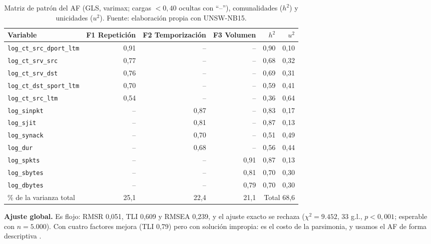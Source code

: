 \begin{table}[htbp]
  \centering
  \caption[Matriz de patrón, comunalidades y unicidades del AF]{Matriz de patrón del AF (GLS, varimax; cargas $<0{,}40$ ocultas con ``--''), comunalidades ($h^2$) y unicidades ($u^2$). Fuente: elaboración propia con UNSW-NB15.}\label{tab:af-patron}
  \begin{tablacompacta}
  \begin{tabular}{@{}lrrrrr@{}}
  \toprule
  Variable & F1 Repetición & F2 Temporización & F3 Volumen & $h^2$ & $u^2$ \\
  \midrule
  \texttt{log\_ct\_src\_dport\_ltm} & 0,91 & -- & -- & 0,90 & 0,10 \\
  \texttt{log\_ct\_srv\_src} & 0,77 & -- & -- & 0,68 & 0,32 \\
  \texttt{log\_ct\_srv\_dst} & 0,76 & -- & -- & 0,69 & 0,31 \\
  \texttt{log\_ct\_dst\_sport\_ltm} & 0,70 & -- & -- & 0,59 & 0,41 \\
  \texttt{log\_ct\_src\_ltm} & 0,54 & -- & -- & 0,36 & 0,64 \\
  \texttt{log\_sinpkt} & -- & 0,87 & -- & 0,83 & 0,17 \\
  \texttt{log\_sjit} & -- & 0,81 & -- & 0,87 & 0,13 \\
  \texttt{log\_synack} & -- & 0,70 & -- & 0,51 & 0,49 \\
  \texttt{log\_dur} & -- & 0,68 & -- & 0,56 & 0,44 \\
  \texttt{log\_spkts} & -- & -- & 0,91 & 0,87 & 0,13 \\
  \texttt{log\_sbytes} & -- & -- & 0,81 & 0,70 & 0,30 \\
  \texttt{log\_dbytes} & -- & -- & 0,79 & 0,70 & 0,30 \\
  \midrule
  \% de la varianza total & 25,1 & 22,4 & 21,1 & \multicolumn{2}{r}{Total 68,6} \\
  \bottomrule
  \end{tabular}
  \end{tablacompacta}
\end{table}

\textbf{Ajuste global.} Es flojo: RMSR 0,051, TLI 0,609 y RMSEA 0,239, y el ajuste exacto se rechaza ($\chi^2=9.452$, 33 g.l., $p<0{,}001$; esperable con $n=5.000$). Con cuatro factores mejora (TLI 0,79) pero con solución impropia: es el costo de la parsimonia, y usamos el AF de forma descriptiva \citep{hair2019,revelle2024}.

